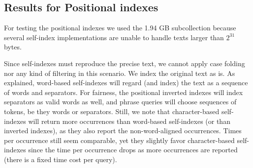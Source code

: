\documentclass[review]{elsarticle}
\begin{document}
\subsection{Results for Positional indexes}

For testing the positional indexes we used the 1.94 GB subcollection 
because several self-index implementations are unable to handle 
texts larger than $2^{31}$ bytes. 

Since self-indexes must reproduce the precise text, we cannot apply case
folding nor any kind of filtering in this scenario. We index the original text
as is. As explained, word-based self-indexes will regard (and index) the text 
as a sequence of words and separators. For fairness, the positional inverted 
indexes will index separators as valid words as well, and phrase queries will 
choose sequences of tokens, be they words or separators. Still, we note that
character-based self-indexes will return more occurrences than word-based
self-indexes (or than inverted indexes), as they also report the
non-word-aligned occurrences. Times per occurrence still seem comparable, yet
they slightly favor character-based self-indexes since
the time per occurrence drops as more occurrences are reported (there is a
fixed time cost per query). 
\end{document}
